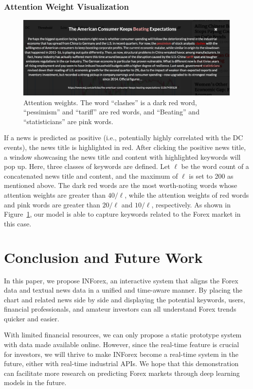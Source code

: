 \documentclass[runningheads]{llncs}
\begin{document}
\subsubsection{Attention Weight Visualization}
\vspace{-1.3cm}
\begin{figure}
  \centering
  \includegraphics[width=0.7\linewidth]{weights.pdf}
  \caption{Attention weights. The word ``clashes'' is a dark red word, ``pessimism'' and ``tariff'' are red words, and ``Beating'' and ``statisticians'' are pink words.}
  
  \label{fig:weights}
\end{figure}
\vspace{-0.7cm}
If a news is predicted as positive (i.e., potentially highly correlated with the DC events), the news title is highlighted in red.
After clicking the positive news title, a window showcasing the news title and content with highlighted keywords will pop up.
Here, three classes of keywords are defined. Let $\ell$ be the word count of a concatenated news title and content, and the maximum of $\ell$ is set to 200 as mentioned above. The dark red words are the most worth-noting words whose attention weights are greater than ${40}/{\ell}$, while the attention weights of red words and pink words are greater than ${20}/{\ell}$ and ${10}/{\ell}$, respectively.
As shown in Figure~\ref{fig:weights}, our model is able to capture keywords related to the Forex market in this case.
\vspace{-0.5cm}
\section{Conclusion and Future Work}\label{sec:conclude}
\vspace{-0.3cm}
In this paper, we propose INForex, an interactive system that aligns the Forex data and textual news data in a unified and
time-aware manner.
By placing the chart and related news side by side and displaying the potential keywords, users, financial
professionals, and amateur investors can all understand Forex trends
quicker and easier.

With limited financial resources, we can only propose a static prototype system with data made available online. However, since the real-time feature is crucial for investors, we will thrive to make INForex become a real-time system in the future, either with real-time industrial APIs.
We hope that this demonstration can facilitate more research on predicting Forex markets through deep learning models in the future.
\end{document}
